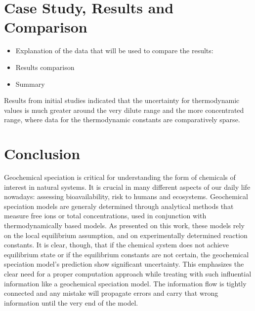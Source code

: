 \documentclass[ppgc,mestrado,english]{iiufrgs}
\begin{document}

\chapter{Case Study, Results and Comparison}
\begin{itemize}
\item Explanation of the data that will be used to compare the results: 
\item Results comparison 
\item	Summary
\end{itemize}

Results from initial studies indicated that the uncertainty for thermodynamic values is much greater around the very dilute range and the more concentrated range, where data for the thermodynamic constants are comparatively sparse. 


\chapter{Conclusion}

Geochemical speciation is critical for understanding the form of chemicals of interest in natural systems. It is crucial in many different aspects of our daily life nowadays: assessing bioavailability, risk to humans and ecosystems. Geochemical speciation models are generaly determined through analytical methods that measure free ions or total concentrations, used in conjunction with thermodynamically based models. As presented on this work, these models rely on the local equilibrium assumption, and on experimentally determined reaction constants. It is clear, though, that if the chemical system does not achieve equilibrium state or if the equilibrium constants are not certain, the geochemical speciation model's prediction show significant uncertainty.
This emphasizes the clear need for a proper computation approach while treating with such influential information like a geochemical speciation model. The information flow is tightly connected and any mistake will propagate errors and carry that wrong information until the very end of the model.
\end{document}
